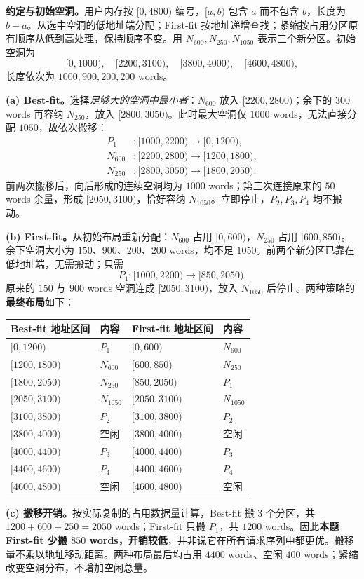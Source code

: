 \begin{checkedsolution}
\nopagebreak[4]
\textbf{约定与初始空洞。}用户内存按 $[0,4800)$ 编号，$[a,b)$ 包含 $a$ 而不包含 $b$，长度为 $b-a$。从选中空洞的低地址端分配；First-fit 按地址递增查找；紧缩按占用分区原有顺序从低到高处理，保持顺序不变。用 $N_{600},N_{250},N_{1050}$ 表示三个新分区。初始空洞为
\[
  [0,1000),\quad[2200,3100),\quad[3800,4000),\quad[4600,4800),
\]
长度依次为 $1000,900,200,200$ words。

\textbf{(a) Best-fit。}选择\emph{足够大的空洞中最小者}：$N_{600}$ 放入 $[2200,2800)$；余下的 $300$ words 再容纳 $N_{250}$，放入 $[2800,3050)$。此时最大空洞仅 $1000$ words，无法直接分配 $1050$，故依次搬移：
\[
\begin{aligned}
  P_1 &: [1000,2200)\longrightarrow[0,1200),\\
  N_{600} &: [2200,2800)\longrightarrow[1200,1800),\\
  N_{250} &: [2800,3050)\longrightarrow[1800,2050).
\end{aligned}
\]
前两次搬移后，向后形成的连续空洞均为 $1000$ words；第三次连接原来的 $50$ words 余量，形成 $[2050,3100)$，恰好容纳 $N_{1050}$。立即停止，$P_2,P_3,P_4$ 均不搬动。

\textbf{(b) First-fit。}从初始布局重新分配：$N_{600}$ 占用 $[0,600)$，$N_{250}$ 占用 $[600,850)$。余下空洞大小为 $150$、$900$、$200$、$200$ words，均不足 $1050$。前两个新分区已靠在低地址端，无需搬动；只需
\[
  P_1:[1000,2200)\longrightarrow[850,2050).
\]
原来的 $150$ 与 $900$ words 空洞连成 $[2050,3100)$，放入 $N_{1050}$ 后停止。两种策略的\textbf{最终布局}如下：
\begin{center}
\begin{tabular}{@{}llll@{}}
\toprule
Best-fit 地址区间 & 内容 & First-fit 地址区间 & 内容 \\
\midrule
$[0,1200)$ & $P_1$ & $[0,600)$ & $N_{600}$ \\
$[1200,1800)$ & $N_{600}$ & $[600,850)$ & $N_{250}$ \\
$[1800,2050)$ & $N_{250}$ & $[850,2050)$ & $P_1$ \\
$[2050,3100)$ & $N_{1050}$ & $[2050,3100)$ & $N_{1050}$ \\
$[3100,3800)$ & $P_2$ & $[3100,3800)$ & $P_2$ \\
$[3800,4000)$ & 空闲 & $[3800,4000)$ & 空闲 \\
$[4000,4400)$ & $P_3$ & $[4000,4400)$ & $P_3$ \\
$[4400,4600)$ & $P_4$ & $[4400,4600)$ & $P_4$ \\
$[4600,4800)$ & 空闲 & $[4600,4800)$ & 空闲 \\
\bottomrule
\end{tabular}
\end{center}

\textbf{(c) 搬移开销。}按实际复制的占用数据量计算，Best-fit 搬 $3$ 个分区，共 $1200+600+250=2050$ words；First-fit 只搬 $P_1$，共 $1200$ words。因此\textbf{本题 First-fit 少搬 $850$ words，开销较低}，并非说它在所有请求序列中都更优。搬移量不乘以地址移动距离。两种布局最后均占用 $4400$ words、空闲 $400$ words；紧缩改变空洞分布，不增加空闲总量。
\end{checkedsolution}

